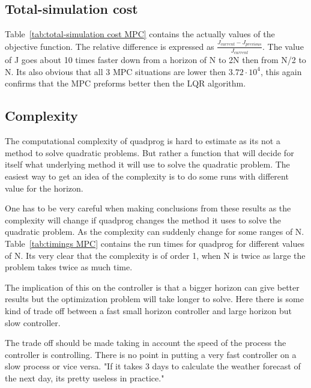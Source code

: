 \subsection{Total-simulation cost}
Table~\ref{tab:total-simulation cost MPC} contains the actually values of the objective function. The relative difference is expressed as $\frac{J_{current}-J_{previous}}{J_{current}}$. The value of J goes about 10 times faster down from a horizon of N to 2N then from N/2 to N. Its also obvious that all 3 MPC situations are lower then $3.72 \cdot 10^{4}$, this again confirms that the MPC preforms better then the LQR algorithm.

\begin{minipage}{\linewidth}
	\centering
	\label{tab:total-simulation cost MPC} 
	
\end{minipage}

\subsection{Complexity}
The computational complexity of quadprog is hard to estimate as its not a method to solve quadratic problems. But rather a function that will decide for itself what underlying method it will use to solve the quadratic problem. The easiest way to get an idea of the complexity is to do some runs with different value for the horizon.

One has to be very careful when making conclusions from these results as the complexity will change if quadprog  changes the method it uses to solve the quadratic problem. As the complexity can suddenly change for some ranges of N. Table~\ref{tab:timings MPC} contains the run times for quadprog for different values of N. Its very clear that the complexity is of order 1, when N is twice as large the problem takes twice as much time.

\begin{minipage}{\linewidth}
	\centering
	 \label{tab:timings MPC} 
	
\end{minipage}

The implication of this on the controller is that a bigger horizon can give better results but the optimization problem will take longer to solve. Here there is some kind of trade off between a fast small horizon controller and large horizon but slow controller.

The trade off should be made taking in account the speed of the process the controller is controlling. There is no point in putting a very fast controller on a slow process or vice versa. "If it takes 3 days to calculate the weather forecast of the next day, its pretty useless in practice."